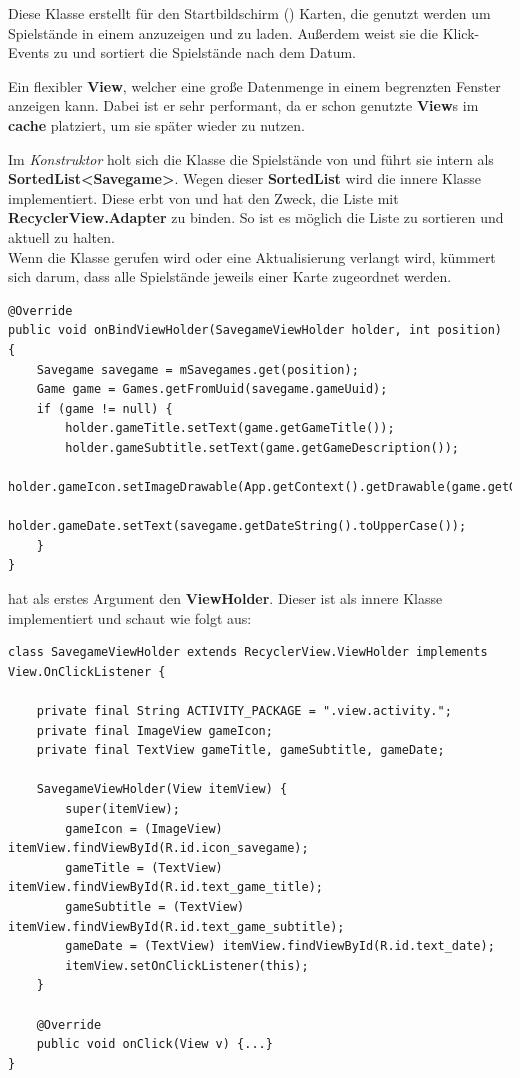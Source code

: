 Diese Klasse erstellt für den Startbildschirm () Karten, die
genutzt werden um Spielstände in einem  anzuzeigen und zu
laden. Außerdem weist sie die Klick-Events zu und sortiert die Spielstände nach
dem Datum.

\begin{infobox}[frametitle=RecyclerView]
Ein flexibler \textbf{View}, welcher eine große Datenmenge in einem begrenzten
Fenster anzeigen kann. Dabei ist er sehr performant, da er schon genutzte
\textbf{View}s im \textbf{cache} platziert, um sie später wieder zu nutzen. 
\end{infobox}

Im \emph{Konstruktor} holt sich die Klasse die Spielstände von
 und führt sie intern als \textbf{SortedList<Savegame>}.
Wegen dieser \textbf{SortedList} wird die innere Klasse
 implementiert. Diese erbt von
 und hat den Zweck, die Liste mit
\textbf{RecyclerView.Adapter} zu binden. So ist es möglich die Liste zu
sortieren und aktuell zu halten.\\

Wenn die Klasse gerufen wird oder eine Aktualisierung verlangt wird, kümmert
sich  darum, dass alle
Spielstände jeweils einer Karte zugeordnet werden.

\begin{lstlisting}[caption={SavegameAdapter onBindViewHolder() Methode},captionpos=b]
@Override
public void onBindViewHolder(SavegameViewHolder holder, int position) {
	Savegame savegame = mSavegames.get(position);
	Game game = Games.getFromUuid(savegame.gameUuid);
	if (game != null) {
		holder.gameTitle.setText(game.getGameTitle());
		holder.gameSubtitle.setText(game.getGameDescription());
		holder.gameIcon.setImageDrawable(App.getContext().getDrawable(game.getGameIconId()));
		holder.gameDate.setText(savegame.getDateString().toUpperCase());
	}
}
\end{lstlisting}

 hat als erstes Argument den \textbf{ViewHolder}.
Dieser ist als innere Klasse implementiert und schaut wie folgt aus:

\begin{lstlisting}[caption={SavegameAdapter SavegameViewHolder Klasse},captionpos=b]
class SavegameViewHolder extends RecyclerView.ViewHolder implements View.OnClickListener {

	private final String ACTIVITY_PACKAGE = ".view.activity.";
	private final ImageView gameIcon;
	private final TextView gameTitle, gameSubtitle, gameDate;

	SavegameViewHolder(View itemView) {
		super(itemView);
		gameIcon = (ImageView) itemView.findViewById(R.id.icon_savegame);
		gameTitle = (TextView) itemView.findViewById(R.id.text_game_title);
		gameSubtitle = (TextView) itemView.findViewById(R.id.text_game_subtitle);
		gameDate = (TextView) itemView.findViewById(R.id.text_date);
		itemView.setOnClickListener(this);
	}

	@Override
	public void onClick(View v) {...}
}
\end{lstlisting}

